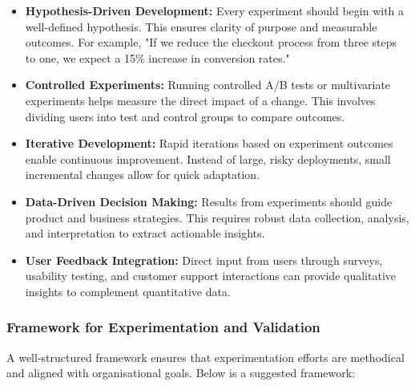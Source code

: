 \begin{itemize}
    \item \textbf{Hypothesis-Driven Development:} Every experiment should begin with a well-defined hypothesis. This ensures clarity of purpose and measurable outcomes. For example, "If we reduce the checkout process from three steps to one, we expect a 15\% increase in conversion rates."
    \item \textbf{Controlled Experiments:} Running controlled A/B tests or multivariate experiments helps measure the direct impact of a change. This involves dividing users into test and control groups to compare outcomes.
    \item \textbf{Iterative Development:} Rapid iterations based on experiment outcomes enable continuous improvement. Instead of large, risky deployments, small incremental changes allow for quick adaptation.
    \item \textbf{Data-Driven Decision Making:} Results from experiments should guide product and business strategies. This requires robust data collection, analysis, and interpretation to extract actionable insights.
    \item \textbf{User Feedback Integration:} Direct input from users through surveys, usability testing, and customer support interactions can provide qualitative insights to complement quantitative data.
\end{itemize}

\subsubsection{Framework for Experimentation and Validation}
A well-structured framework ensures that experimentation efforts are methodical and aligned with organisational goals. Below is a suggested framework:

